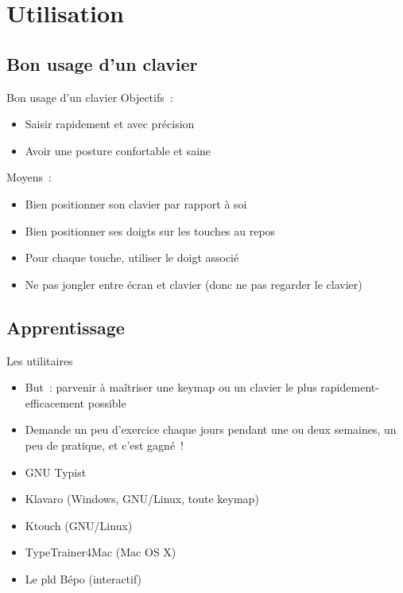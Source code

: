 \section{Utilisation}



\subsection{Bon usage d’un clavier}

\begin{frame}{Bon usage d’un clavier}
    Objectifs~:
    \begin{itemize}
        \item Saisir rapidement et avec précision \pause

        \item Avoir une posture confortable et saine
    \end{itemize}

    Moyens~:
    \begin{itemize}
        \item Bien positionner son clavier par rapport à soi \pause

        \item Bien positionner ses doigts sur les touches au repos \pause

        \item Pour chaque touche, utiliser le doigt associé \pause

        \item Ne pas jongler entre écran et clavier (donc ne pas regarder le clavier)
    \end{itemize}
\end{frame}



\subsection{Apprentissage}

\begin{frame}{Les utilitaires}
    \begin{itemize}
        \item But~: parvenir à maîtriser une keymap ou un clavier le plus
          rapidement-efficacement possible \pause
        \item Demande un peu d’exercice chaque jours pendant une ou deux
          semaines, un peu de pratique, et c’est gagné~! \pause

	\item GNU Typist \pause
        \item Klavaro (Windows, GNU/Linux, toute keymap) \pause
        \item Ktouch (GNU/Linux) \pause
        \item TypeTrainer4Mac (Mac OS X) \pause
	\item Le pld Bépo (interactif)
    \end{itemize}
\end{frame}

